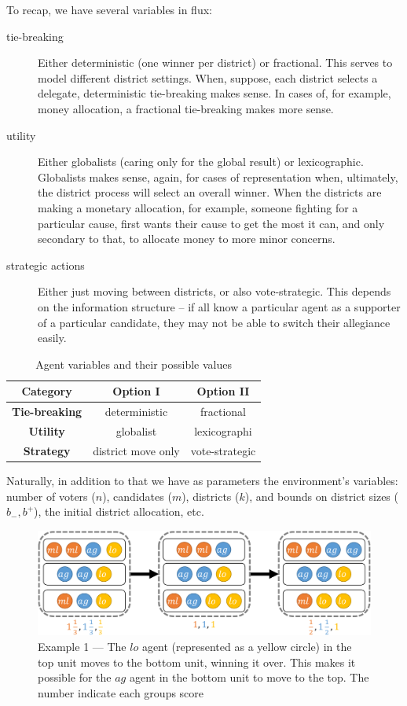 \documentclass[letterpaper]{article} %
\begin{document}
To recap, we have several variables in flux:
\begin{description}
\item[tie-breaking] Either deterministic (one winner per district) or fractional. This serves to model different district settings. When, suppose, each district selects a delegate, deterministic tie-breaking makes sense. In cases of, for example, money allocation, a fractional tie-breaking makes more sense.
\item[utility] Either globalists (caring only for the global result) or lexicographic. Globalists makes sense, again, for cases of representation when, ultimately, the district process will select an overall winner. When the districts are making a monetary allocation, for example, someone fighting for a particular cause, first wants their cause to get the most it can, and only secondary to that, to allocate money to more minor concerns.
\item[strategic actions] Either just moving between districts, or also vote-strategic. This depends on the information structure -- if all know a particular agent as a supporter of a particular candidate, they may not be able to switch their allegiance easily.
\end{description}
\begin{table}[htp]
\caption{Agent variables and their possible values}
\begin{center}
\begin{tabular}{|c|c|c|}
\hline
\textbf{Category} & \textbf{Option I}& \textbf{Option II}\\
\hline
\textbf{Tie-breaking} & deterministic & fractional\\
\textbf{Utility} & globalist & lexicographi\\
\textbf{Strategy} & district move only & vote-strategic\\
\hline
\end{tabular}
\end{center}
\end{table}


Naturally, in addition to that we have as parameters the environment's variables: number of voters ($n$), candidates ($m$), districts ($k$), and bounds on district sizes ($b_{-},b^{+}$), the initial district allocation, etc.
\begin{figure}
\centering
\includegraphics[width=\columnwidth]{example.pdf}
\caption{Example 1 --- The $lo$ agent (represented as a yellow circle) in the top unit moves to the bottom unit, winning it over. This makes it possible for the $ag$ agent in the bottom unit to move to the top. The number indicate each groups score}
\label{fig:example}
\end{figure}
\end{document}
